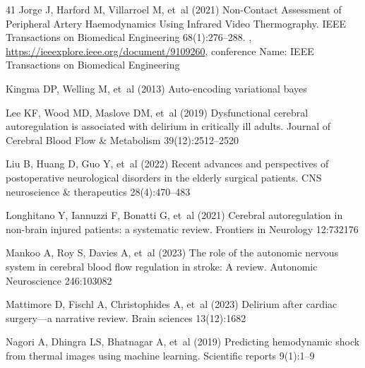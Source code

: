 \documentclass[pdflatex,sn-basic,Numbered]{sn-jnl}
\theoremstyle{thmstyleone}%
\theoremstyle{thmstyletwo}%
\theoremstyle{thmstylethree}%
\begin{document}
\begin{thebibliography}{41}
  Jorge J, Harford M, Villarroel M, et~al (2021) Non-{Contact} {Assessment} of
  {Peripheral} {Artery} {Haemodynamics} {Using} {Infrared} {Video}
  {Thermography}. IEEE Transactions on Biomedical Engineering 68(1):276--288.
  ,
  \urlprefix\url{https://ieeexplore.ieee.org/document/9109260}, conference
  Name: IEEE Transactions on Biomedical Engineering

  Kingma DP, Welling M, et~al (2013) Auto-encoding variational bayes

  Lee KF, Wood MD, Maslove DM, et~al (2019) Dysfunctional cerebral autoregulation
  is associated with delirium in critically ill adults. Journal of Cerebral
  Blood Flow \& Metabolism 39(12):2512--2520

  Liu B, Huang D, Guo Y, et~al (2022) Recent advances and perspectives of
  postoperative neurological disorders in the elderly surgical patients. CNS
  neuroscience \& therapeutics 28(4):470--483

  Longhitano Y, Iannuzzi F, Bonatti G, et~al (2021) Cerebral autoregulation in
  non-brain injured patients: a systematic review. Frontiers in Neurology
  12:732176

  Mankoo A, Roy S, Davies A, et~al (2023) The role of the autonomic nervous
  system in cerebral blood flow regulation in stroke: A review. Autonomic
  Neuroscience 246:103082

  Mattimore D, Fischl A, Christophides A, et~al (2023) Delirium after cardiac
  surgery—a narrative review. Brain sciences 13(12):1682

  Nagori A, Dhingra LS, Bhatnagar A, et~al (2019) Predicting hemodynamic shock
  from thermal images using machine learning. Scientific reports 9(1):1--9


\end{thebibliography}
\end{document}
